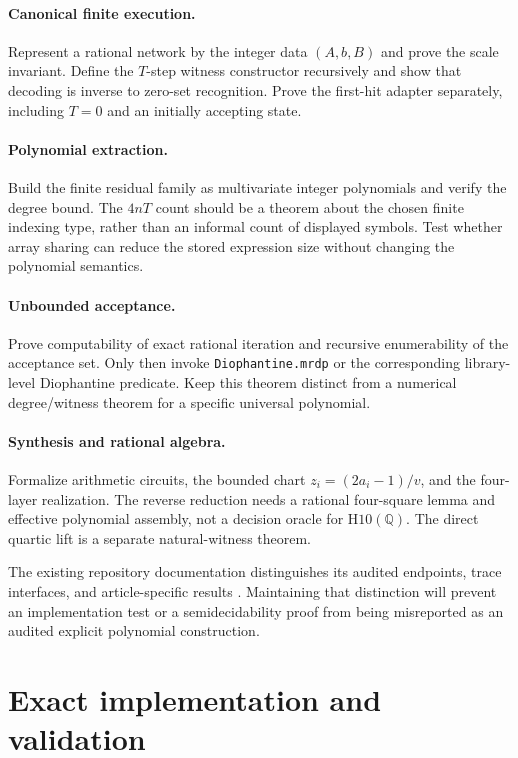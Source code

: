 \documentclass[11pt,letterpaper]{article}
\numberwithin{equation}{section}
\theoremstyle{definition}
\theoremstyle{remark}
\newcommand{\Q}{\mathbb Q}
\newcommand{\srcmark}[1]{\par\noindent{\small\itshape [source~#1]}\par}
\newcommand{\Hten}{\mathrm{H10}(\Q)}
\begin{document}
\paragraph{Canonical finite execution.}
Represent a rational network by the integer data $(A,b,B)$ and prove the
scale invariant. Define the $T$-step witness constructor recursively and
show that decoding is inverse to zero-set recognition. Prove the first-hit
adapter separately, including $T=0$ and an initially accepting state.

\paragraph{Polynomial extraction.}
Build the finite residual family as multivariate integer polynomials and
verify the degree bound. The $4nT$ count should be a theorem about the
chosen finite indexing type, rather than an informal count of displayed
symbols. Test whether array sharing can reduce the stored expression size
without changing the polynomial semantics.

\paragraph{Unbounded acceptance.}
Prove computability of exact rational iteration and recursive enumerability
of the acceptance set. Only then invoke \texttt{Diophantine.mrdp} or the
corresponding library-level Diophantine predicate. Keep this theorem distinct
from a numerical degree/witness theorem for a specific universal polynomial.

\paragraph{Synthesis and rational algebra.}
Formalize arithmetic circuits, the bounded chart $z_i=(2a_i-1)/v$, and the
four-layer realization. The reverse reduction needs a rational
four-square lemma and effective polynomial assembly, not a decision oracle
for $\Hten$. The direct quartic lift is a separate natural-witness theorem.

The existing repository documentation distinguishes its audited endpoints,
trace interfaces, and article-specific results \cite{b62s15-proveit,b62s15-proveit-mrdp}.
Maintaining that distinction will prevent an implementation test or a
semidecidability proof from being misreported as an audited explicit
polynomial construction.

\section{Exact implementation and validation}
\label{pqc:pm:sec:validation}
\srcmark{15}
\end{document}
